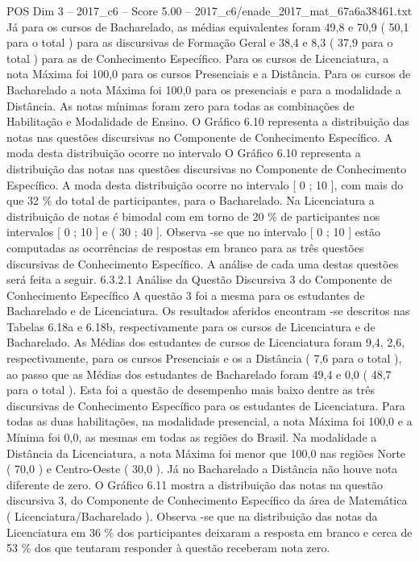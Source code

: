 \begin{textsample}{POS Dim 3 – 2017\_c6 – Score 5.00 – 2017\_c6/enade\_2017\_mat\_67a6a38461.txt}
Já para os cursos de Bacharelado, as médias equivalentes foram 49,8 e 70,9 ( 50,1 para o total ) para as discursivas de Formação Geral e 38,4 e 8,3 ( 37,9 para o total ) para as de Conhecimento Específico.
Para os cursos de Licenciatura, a nota Máxima foi 100,0 para os cursos Presenciais e a Distância.
Para os cursos de Bacharelado a nota Máxima foi 100,0 para os presenciais e para a modalidade a Distância.
As notas mínimas foram zero para todas as combinações de Habilitação e Modalidade de Ensino.
O Gráfico 6.10 representa a distribuição das notas nas questões discursivas no Componente de Conhecimento Específico.
A moda desta distribuição ocorre no intervalo O Gráfico 6.10 representa a distribuição das notas nas questões discursivas no Componente de Conhecimento Específico.
A moda desta distribuição ocorre no intervalo [ 0 ; 10 ], com mais do que 32 \% do total de participantes, para o Bacharelado.
Na Licenciatura a distribuição de notas é bimodal com em torno de 20 \% de participantes nos intervalos [ 0 ; 10 ] e ( 30 ; 40 ].
Observa -se que no intervalo [ 0 ; 10 ] estão computadas as ocorrências de respostas em branco para as três questões discursivas de Conhecimento Específico.
A análise de cada uma destas questões será feita a seguir. 6.3.2.1 Análise da Questão Discursiva 3 do Componente de Conhecimento Específico A questão 3 foi a mesma para os estudantes de Bacharelado e de Licenciatura.
Os resultados aferidos encontram -se descritos nas Tabelas 6.18a e 6.18b, respectivamente para os cursos de Licenciatura e de Bacharelado.
As Médias dos estudantes de cursos de Licenciatura foram 9,4, 2,6, respectivamente, para os cursos Presenciais e os a Distância ( 7,6 para o total ), ao passo que as Médias dos estudantes de Bacharelado foram 49,4 e 0,0 ( 48,7 para o total ).
Esta foi a questão de desempenho mais baixo dentre as três discursivas de Conhecimento Específico para os estudantes de Licenciatura.
Para todas as duas habilitações, na modalidade presencial, a nota Máxima foi 100,0 e a Mínima foi 0,0, as mesmas em todas as regiões do Brasil.
Na modalidade a Distância da Licenciatura, a nota Máxima foi menor que 100,0 nas regiões Norte ( 70,0 ) e Centro-Oeste ( 30,0 ).
Já no Bacharelado a Distância não houve nota diferente de zero.
O Gráfico 6.11 mostra a distribuição das notas na questão discursiva 3, do Componente de Conhecimento Específico da área de Matemática ( Licenciatura/Bacharelado ).
Observa -se que na distribuição das notas da Licenciatura em 36 \% dos participantes deixaram a resposta em branco e cerca de 53 \% dos que tentaram responder à questão receberam nota zero.

\end{textsample}
